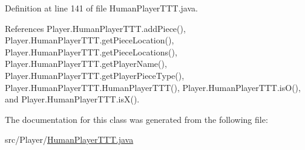 Definition at line 141 of file Human\+Player\+T\+T\+T.\+java.



References Player.\+Human\+Player\+T\+T\+T.\+add\+Piece(), Player.\+Human\+Player\+T\+T\+T.\+get\+Piece\+Location(), Player.\+Human\+Player\+T\+T\+T.\+get\+Piece\+Locations(), Player.\+Human\+Player\+T\+T\+T.\+get\+Player\+Name(), Player.\+Human\+Player\+T\+T\+T.\+get\+Player\+Piece\+Type(), Player.\+Human\+Player\+T\+T\+T.\+Human\+Player\+T\+T\+T(), Player.\+Human\+Player\+T\+T\+T.\+is\+O(), and Player.\+Human\+Player\+T\+T\+T.\+is\+X().



The documentation for this class was generated from the following file\+:\begin{DoxyCompactItemize}
\item 
src/\+Player/\hyperlink{_human_player_t_t_t_8java}{Human\+Player\+T\+T\+T.\+java}\end{DoxyCompactItemize}
